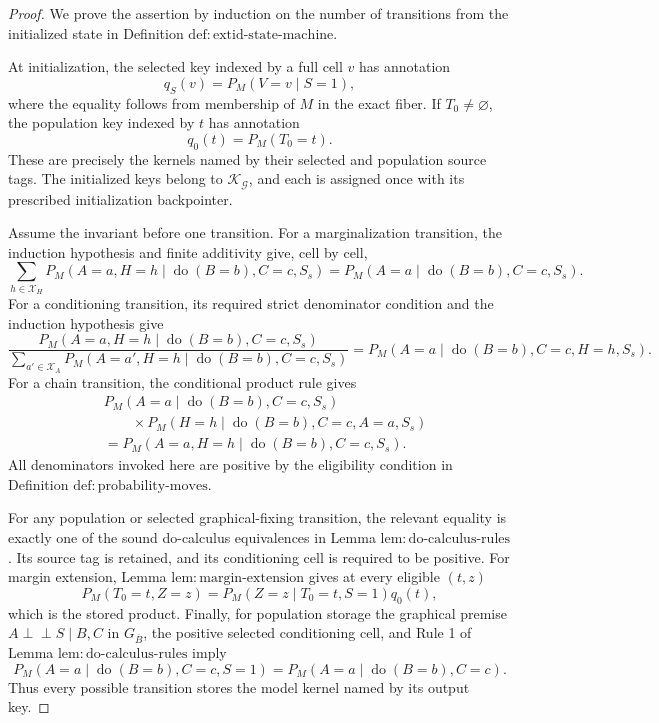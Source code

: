 \documentclass{article}
\begin{document}
\begin{proof}
We prove the assertion by induction on the number of transitions from the initialized state in Definition \(\mathrm{def{:}extid\text{-}state\text{-}machine}\).

At initialization, the selected key indexed by a full cell \(v\) has annotation
\[
 q_S(v)=P_M(V=v\mid S=1),
\]
where the equality follows from membership of \(M\) in the exact fiber.  If \(T_0\neq\varnothing\), the population key indexed by \(t\) has annotation
\[
 q_0(t)=P_M(T_0=t).
\]
These are precisely the kernels named by their selected and population source tags.  The initialized keys belong to \(\mathscr K_{\mathcal G}\), and each is assigned once with its prescribed initialization backpointer.

Assume the invariant before one transition.  For a marginalization transition, the induction hypothesis and finite additivity give, cell by cell,
\[
 \sum_{h\in\mathcal X_H}
 P_M(A=a,H=h\mid\operatorname{do}(B=b),C=c,S_s)
 =P_M(A=a\mid\operatorname{do}(B=b),C=c,S_s).
\]
For a conditioning transition, its required strict denominator condition and the induction hypothesis give
\[
 \frac{P_M(A=a,H=h\mid\operatorname{do}(B=b),C=c,S_s)}
 {\sum_{a'\in\mathcal X_A}P_M(A=a',H=h\mid\operatorname{do}(B=b),C=c,S_s)}
 =P_M(A=a\mid\operatorname{do}(B=b),C=c,H=h,S_s).
\]
For a chain transition, the conditional product rule gives
\[
 \begin{aligned}
 &P_M(A=a\mid\operatorname{do}(B=b),C=c,S_s)\\
 &\qquad{}\times
 P_M(H=h\mid\operatorname{do}(B=b),C=c,A=a,S_s)\\
 &=P_M(A=a,H=h\mid\operatorname{do}(B=b),C=c,S_s).
 \end{aligned}
\]
All denominators invoked here are positive by the eligibility condition in Definition \(\mathrm{def{:}probability\text{-}moves}\).

For any population or selected graphical-fixing transition, the relevant equality is exactly one of the sound do-calculus equivalences in Lemma \(\mathrm{lem{:}do\text{-}calculus\text{-}rules}\).  Its source tag is retained, and its conditioning cell is required to be positive.  For margin extension, Lemma \(\mathrm{lem{:}margin\text{-}extension}\) gives at every eligible \((t,z)\)
\[
 P_M(T_0=t,Z=z)
 =P_M(Z=z\mid T_0=t,S=1)q_0(t),
\]
which is the stored product.  Finally, for population storage the graphical premise \(A\perp\!\!\!\perp S\mid B,C\) in \(G_{\overline B}\), the positive selected conditioning cell, and Rule 1 of Lemma \(\mathrm{lem{:}do\text{-}calculus\text{-}rules}\) imply
\[
 P_M(A=a\mid\operatorname{do}(B=b),C=c,S=1)
 =P_M(A=a\mid\operatorname{do}(B=b),C=c).
\]
Thus every possible transition stores the model kernel named by its output key.


\end{proof}
\end{document}
